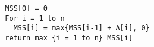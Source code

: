 
\begin{verbatim}
  MSS[0] = 0
  For i = 1 to n
    MSS[i] = max{MSS[i-1] + A[i], 0}
  return max_{i = 1 to n} MSS[i]
\end{verbatim}
